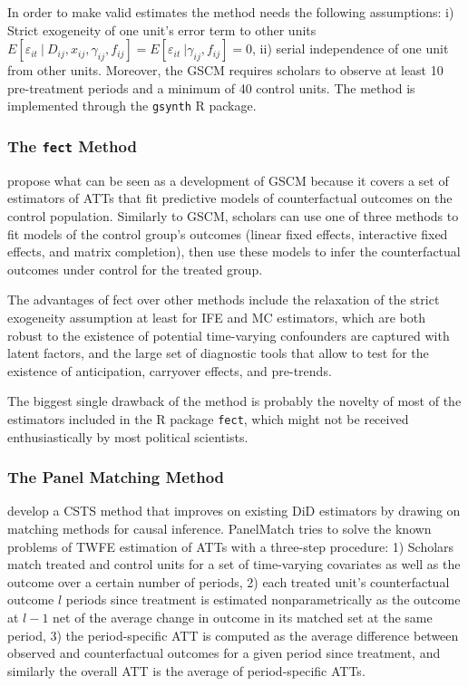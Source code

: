 \documentclass[hidelinks]{article}\usepackage[]{graphicx}\usepackage[]{xcolor}
\begin{document}
In order to make valid estimates the method needs the following assumptions: i) Strict exogeneity of one unit's error term to other units $E\left[ \varepsilon_{it}\ | \ D_{ij},x_{ij},\gamma_{ij}, f_{ij}\right] = E\left[ \varepsilon_{it}\ | \gamma_{ij}, f_{ij}\right] = 0$, ii) serial independence of one unit from other units. Moreover, the GSCM requires scholars to observe at least 10 pre-treatment periods and a minimum of 40 control units. The method is implemented through the \texttt{gsynth} R package.

\subsubsection{The \texttt{fect} Method}

\textcite{Liu} propose what can be seen as a development of GSCM because it covers a set of estimators of ATTs that fit predictive models of counterfactual outcomes on the control population. Similarly to GSCM, scholars can use one of three methods to fit models of the control group's outcomes (linear fixed effects, interactive fixed effects, and matrix completion), then use these models to infer the counterfactual outcomes under control for the treated group. 

The advantages of fect over other methods include the relaxation of the strict exogeneity assumption at least for IFE and MC estimators, which are both robust to the existence of potential time-varying confounders are captured with latent factors, and the large set of diagnostic tools that allow to test for the existence of anticipation, carryover effects, and pre-trends.

The biggest single drawback of the method is probably the novelty of most of the estimators included in the R package \texttt{fect}, which might not be received enthusiastically by most political scientists.


\subsubsection{The Panel Matching Method}

\textcite{Imai2021} develop a CSTS method that improves on existing DiD estimators by drawing on matching methods for causal inference. PanelMatch tries to solve the known problems of TWFE estimation of ATTs with a three-step procedure: 1) Scholars match treated and control units for a set of time-varying covariates as well as the outcome over a certain number of periods, 2) each treated unit's counterfactual outcome $l$ periods since treatment is estimated nonparametrically as the outcome at $l-1$ net of the average change in outcome in its matched set at the same period, 3) the period-specific ATT is computed as the average difference between observed and counterfactual outcomes for a given period since treatment, and similarly the overall ATT is the average of period-specific ATTs.
\end{document}
